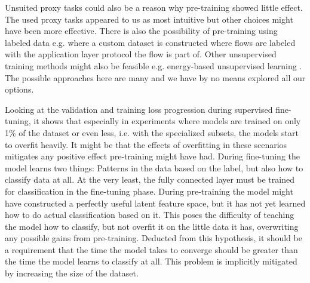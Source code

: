 Unsuited proxy tasks could also be a reason why pre-training showed little effect. The used proxy tasks appeared to us as most intuitive but other choices might have been more effective. There is also the possibility of pre-training using labeled data e.g. where a custom dataset is constructed where flows are labeled with the application layer protocol the flow is part of. Other unsupervised training methods might also be feasible e.g. energy-based unsupervised learning \cite{energy_based_training}. The possible approaches here are many and we have by no means explored all our options. \par

Looking at the validation and training loss progression during supervised fine-tuning, it shows that especially in experiments where models are trained on only 1\% of the dataset or even less, i.e. with the specialized subsets, the models start to overfit heavily. It might be that the effects of overfitting in these scenarios mitigates any positive effect pre-training might have had. During fine-tuning the model learns two things: Patterns in the data based on the label, but also how to classify data at all. At the very least, the fully connected layer must be trained for classification in the fine-tuning phase. During pre-training the model might have constructed a perfectly useful latent feature space, but it has not yet learned how to do actual classification based on it. This poses the difficulty of teaching the model how to classify, but not overfit it on the little data it has, overwriting any possible gains from pre-training. Deducted from this hypothesis, it should be a requirement that the time the model takes to converge should be greater than the time the model learns to classify at all. This problem is implicitly mitigated by increasing the size of the dataset.\par


